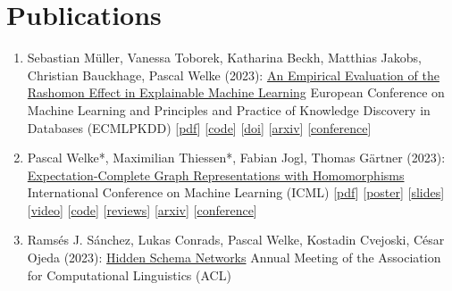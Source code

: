 \documentclass{scrartcl}
\begin{document}
\section{Publications}
\begin{enumerate}
\conti
\item
\label{mueller2023ecml}
Sebastian Müller, Vanessa Toborek, Katharina Beckh, Matthias Jakobs, Christian Bauckhage, Pascal Welke (2023):\newline
\href{https://dx.doi.org/10.1007/978-3-031-43418-1_28}{An Empirical Evaluation of the Rashomon Effect in Explainable Machine Learning}\newline
European Conference on Machine Learning and Principles and Practice of Knowledge Discovery in Databases (ECMLPKDD)\newline
{\footnotesize
[\href{https://pwelke.github.io/publications/mueller2023rashomon.pdf}{pdf}]
[\href{https://github.com/lamarr-xai-group/RashomonEffect}{code}]
[\href{https://dx.doi.org/10.1007/978-3-031-43418-1_28}{doi}]
[\href{https://arxiv.org/abs/2306.15786}{arxiv}]
[\href{https://2023.ecmlpkdd.org}{conference}]
}
\item
\label{welke2023expectation}
Pascal Welke*, Maximilian Thiessen*, Fabian Jogl, Thomas Gärtner (2023):\newline
\href{https://proceedings.mlr.press/v202/welke23a.html}{Expectation-Complete Graph Representations with Homomorphisms}\newline
International Conference on Machine Learning (ICML)\newline
{\footnotesize
[\href{https://pwelke.github.io/publications/welkethiessen2023expectationcomplete.pdf}{pdf}]
[\href{https://pwelke.github.io/publications/expectation_complete_poster_ICML.pdf}{poster}]
[\href{https://pwelke.github.io/publications/expectation_complete_slides_ICML.pdf}{slides}]
[\href{https://slideslive.com/39003466/expectationcomplete-graph-representations-with-homomorphisms}{video}]
[\href{https://github.com/pwelke/homcount}{code}]
[\href{https://openreview.net/forum?id=ppgRPC14uI}{reviews}]
[\href{https://arxiv.org/abs/2306.05838}{arxiv}]
[\href{https://icml.cc/Conferences/2023}{conference}]
}
\item
\label{sanchez2023hiddenschema}
Ramsés J. Sánchez, Lukas Conrads, Pascal Welke, Kostadin Cvejoski, César Ojeda (2023):\newline
\href{https://dx.doi.org/10.18653/v1/2023.acl-long.263}{Hidden Schema Networks}\newline
Annual Meeting of the Association for Computational Linguistics (ACL)\newline

\end{enumerate}
\end{document}
